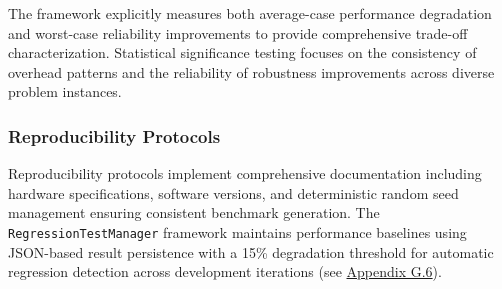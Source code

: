The framework explicitly measures both average-case performance degradation and worst-case reliability improvements to provide comprehensive trade-off characterization. Statistical significance testing focuses on the consistency of overhead patterns and the reliability of robustness improvements across diverse problem instances.

\subsubsection{Reproducibility Protocols}
\label{sec:reproducibility-protocols}
Reproducibility protocols implement comprehensive documentation including hardware specifications, software versions, and deterministic random seed management ensuring consistent benchmark generation. The \texttt{RegressionTestManager} framework maintains performance baselines using JSON-based result persistence with a 15\% degradation threshold for automatic regression detection across development iterations (see \hyperref[appendix:regression-testing]{Appendix G.6}).